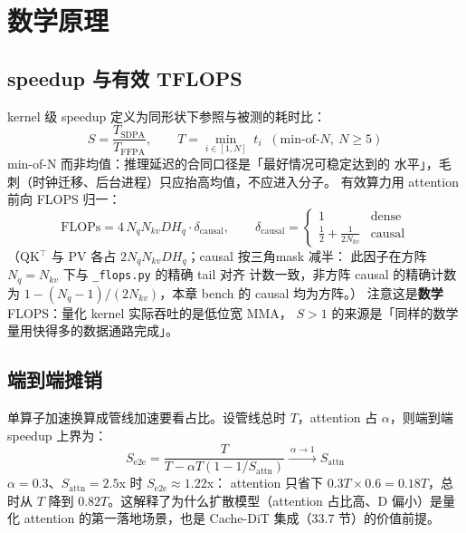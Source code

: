 \section{数学原理}

\subsection{speedup 与有效 TFLOPS}

kernel 级 speedup 定义为同形状下参照与被测的耗时比：
\begin{equation}
  S=\frac{T_{\mathrm{SDPA}}}{T_{\mathrm{FFPA}}},\qquad
  T=\min_{i\in[1,N]}\;t_i\;\;(\text{min-of-}N,\ N\ge5)
\end{equation}
min-of-N 而非均值：推理延迟的合同口径是「最好情况可稳定达到的
水平」，毛刺（时钟迁移、后台进程）只应抬高均值，不应进入分子。
有效算力用 attention 前向 FLOPS 归一：
\begin{equation}
  \mathrm{FLOPs}=4\,N_qN_{kv}DH_q\cdot\delta_{\mathrm{causal}},\qquad
  \delta_{\mathrm{causal}}=
  \begin{cases}1 & \text{dense}\\[2pt] \tfrac{1}{2}+\tfrac{1}{2N_{kv}} & \text{causal}\end{cases}
\end{equation}
（QK$^\top$ 与 PV 各占 $2N_qN_{kv}DH_q$；causal 按三角mask 减半：
此因子在方阵 $N_q=N_{kv}$ 下与 \texttt{\_flops.py} 的精确 tail 对齐
计数一致，非方阵 causal 的精确计数为
$1-(N_q-1)/(2N_{kv})$，本章 bench 的 causal 均为方阵。）
注意这是\textbf{数学} FLOPS：量化 kernel 实际吞吐的是低位宽 MMA，
$S>1$ 的来源是「同样的数学量用快得多的数据通路完成」。

\subsection{端到端摊销}

单算子加速换算成管线加速要看占比。设管线总时 $T$，attention 占
$\alpha$，则端到端 speedup 上界为：
\begin{equation}
  S_{\mathrm{e2e}}=\frac{T}{T-\alpha T(1-1/S_{\mathrm{attn}})}
  \xrightarrow{\ \alpha\to1\ }S_{\mathrm{attn}}
  \label{eq:33-e2e}
\end{equation}
$\alpha=0.3$、$S_{\mathrm{attn}}=2.5$x 时 $S_{\mathrm{e2e}}\approx1.22$x：
attention 只省下 $0.3T\times0.6=0.18T$，总时从 $T$ 降到
$0.82T$。这解释了为什么扩散模型（attention 占比高、D 偏小）是量化 attention
的第一落地场景，也是 Cache-DiT 集成（33.7 节）的价值前提。

